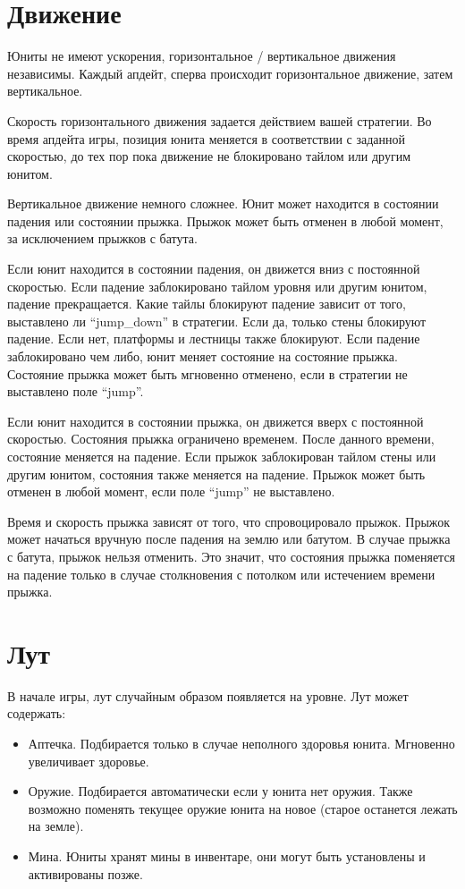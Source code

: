 \section{Движение}

Юниты не имеют ускорения, горизонтальное / вертикальное движения независимы.
Каждый апдейт, сперва происходит горизонтальное движение, затем вертикальное.

Скорость горизонтального движения задается действием вашей стратегии.
Во время апдейта игры, позиция юнита меняется в соответствии с заданной скоростью, до тех пор пока движение не блокировано тайлом или другим юнитом.

Вертикальное движение немного сложнее. Юнит может находится в состоянии падения или состоянии прыжка.
Прыжок может быть отменен в любой момент, за исключением прыжков с батута.

Если юнит находится в состоянии падения, он движется вниз с постоянной скоростью.
Если падение заблокировано тайлом уровня или другим юнитом, падение прекращается.
Какие тайлы блокируют падение зависит от того, выставлено ли ``jump\_down'' в стратегии.
Если да, только стены блокируют падение. Если нет, платформы и лестницы также блокируют.
Если падение заблокировано чем либо, юнит меняет состояние на состояние прыжка.
Состояние прыжка может быть мгновенно отменено, если в стратегии не выставлено поле ``jump''.

Если юнит находится в состоянии прыжка, он движется вверх с постоянной скоростью.
Состояния прыжка ограничено временем. После данного времени, состояние меняется на падение.
Если прыжок заблокирован тайлом стены или другим юнитом, состояния также меняется на падение.
Прыжок может быть отменен в любой момент, если поле ``jump'' не выставлено.

Время и скорость прыжка зависят от того, что спровоцировало прыжок.
Прыжок может начаться вручную после падения на землю или батутом.
В случае прыжка с батута, прыжок нельзя отменить.
Это значит, что состояния прыжка поменяется на падение только в случае столкновения с потолком или истечением времени прыжка.

\section{Лут}

В начале игры, лут случайным образом появляется на уровне. Лут может содержать:
\begin{itemize}
      \item Аптечка. Подбирается только в случае неполного здоровья юнита.
            Мгновенно увеличивает здоровье.
      \item Оружие. Подбирается автоматически если у юнита нет оружия.
            Также возможно поменять текущее оружие юнита на новое (старое останется лежать на земле).
      \item Мина. Юниты хранят мины в инвентаре, они могут быть установлены и активированы позже.
\end{itemize}

